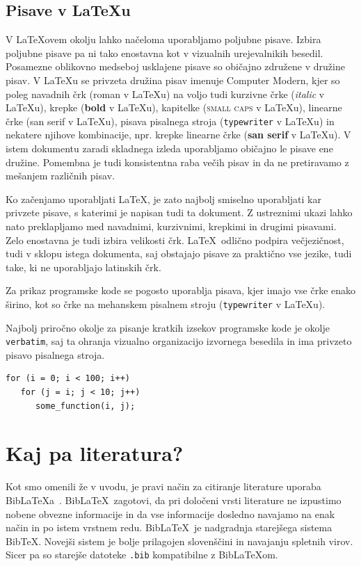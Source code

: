 \documentclass[a4paper,12pt,openright]{book}
\newcommand{\BibLaTeX}{{\sc Bib}\LaTeX}
\newcommand{\BibTeX}{{\sc Bib}\TeX}
\begin{document}
\section{Pisave v \LaTeX u}

V  \LaTeX ovem okolju lahko načeloma uporabljamo poljubne pisave. 
Izbira poljubne pisave pa ni tako enostavna kot v vizualnih urejevalnikih besedil.
Posamezne oblikovno medseboj usklajene pisave so običajno združene v družine pisav.
V \LaTeX u se privzeta družina pisav imenuje Computer Modern,
kjer so poleg navadnih črk (roman v \LaTeX u) na voljo tudi kurzivne črke (\textit{italic} v \LaTeX u), 
krepke (\textbf{bold} v \LaTeX u), kapitelke (\textsc{small caps} v \LaTeX u), linearne črke ({\textsf{san serif} v \LaTeX u}), pisava pisalnega stroja (\texttt{typewriter} v \LaTeX u) in nekatere njihove kombinacije, npr. krepke linearne črke 
({\textbf{\textsf{san serif}} v \LaTeX u}).
V istem dokumentu zaradi skladnega izleda uporabljamo običajno le pisave ene družine. 
Pomembna je tudi konsistentna raba večih pisav in da ne pretiravamo z mešanjem različnih pisav.

Ko začenjamo uporabljati \LaTeX, je zato najbolj smiselno uporabljati kar privzete pisave, s katerimi je napisan tudi ta dokument.
Z ustreznimi ukazi  lahko nato preklapljamo med navadnimi, kurzivnimi, krepkimi in drugimi pisavami. 
Zelo enostavna je tudi izbira velikosti črk.
\LaTeX\  odlično podpira večjezičnost, tudi v sklopu istega dokumenta, saj obstajajo pisave za praktično vse jezike, tudi take, ki ne uporabljajo latinskih črk.

Za prikaz programske kode se pogosto uporablja pisava, kjer imajo vse črke enako širino, kot so  črke na mehanskem pisalnem stroju ({\texttt{typewriter} v \LaTeX u}).

Najbolj priročno okolje za pisanje kratkih izsekov programske kode je okolje \texttt{verbatim}, saj ta ohranja vizualno organizacijo izvornega besedila in ima privzeto pisavo pisalnega stroja.

\begin{verbatim}
for (i = 0; i < 100; i++)
   for (j = i; j < 10; j++)
      some_function(i, j);
\end{verbatim}




\chapter{Kaj pa literatura?}
\label{lit}

Kot smo omenili že v uvodu, je pravi način za citiranje literature uporaba \BibLaTeX{a}~\cite{biblatex}. 
\BibLaTeX\ zagotovi, da pri določeni vrsti literature ne izpustimo 
nobene obvezne informacije 
in da vse informacije dosledno navajamo na enak način in po istem vrstnem redu.
\BibLaTeX\ je nadgradnja starejšega sistema \BibTeX. Novejši sistem je bolje prilagojen slovenščini in navajanju spletnih virov. Sicer pa so starejše datoteke \texttt{.bib} kompatibilne z \BibLaTeX om.
\end{document}
